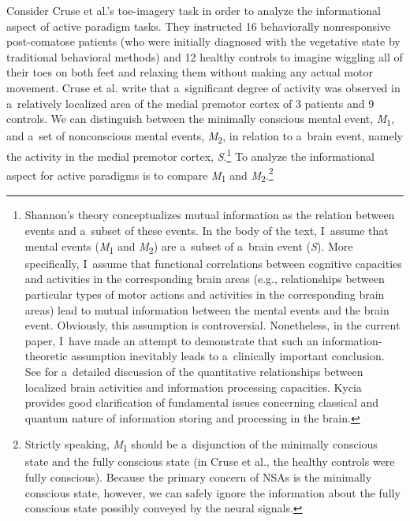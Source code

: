 Consider Cruse et al.'s
\parencite*[][]{cruse_bedside_2011} %
 toe-imagery task in order to analyze the informational aspect of active paradigm tasks. They instructed 16 behaviorally nonresponsive post-comatose patients (who were initially diagnosed with the vegetative state by traditional behavioral methods) and 12 healthy controls to imagine wiggling all of their toes on both feet and relaxing them without making any actual motor movement. Cruse et al. write that a~significant degree of activity was observed in a~relatively localized area of the medial premotor cortex of 3 patients and 9 controls. We can distinguish between the minimally conscious mental event, \textit{M}\textsubscript{1}, and a~set of nonconscious mental events, \textit{M}\textsubscript{2}, in relation to a~brain event, namely the activity in the medial premotor cortex, \textit{S}.\footnote{ Shannon's theory conceptualizes mutual information as the relation between events and a~subset of these events. In the body of the text, I~assume that mental events (\textit{M}\textsubscript{1} and \textit{M}\textsubscript{2}) are a~subset of a~brain event (\textit{S}). More specifically, I~assume that functional correlations between cognitive capacities and activities in the corresponding brain areas (e.g., relationships between particular types of motor actions and activities in the corresponding brain areas) lead to mutual information between the mental events and the brain event. Obviously, this assumption is controversial. Nonetheless, in the current paper, I~have made an attempt to demonstrate that such an information-theoretic assumption inevitably leads to a~clinically important conclusion. See 
\parencite[][]{li_brain_2022} %
 for a~detailed discussion of the quantitative relationships between localized brain activities and information processing capacities. Kycia 
\parencite*[][]{kycia_information_2021} %
 provides good clarification of fundamental issues concerning classical and quantum nature of information storing and processing in the brain.} To analyze the informational aspect for active paradigms is to compare \textit{M}\textsubscript{1} and \textit{M}\textsubscript{2}.\footnote{ Strictly speaking, \textit{M}\textsubscript{1} should be a~disjunction of the minimally conscious state and the fully conscious state (in Cruse et al., the healthy controls were fully conscious). Because the primary concern of NSAs is the minimally conscious state, however, we can safely ignore the information about the fully conscious state possibly conveyed by the neural signals.}

